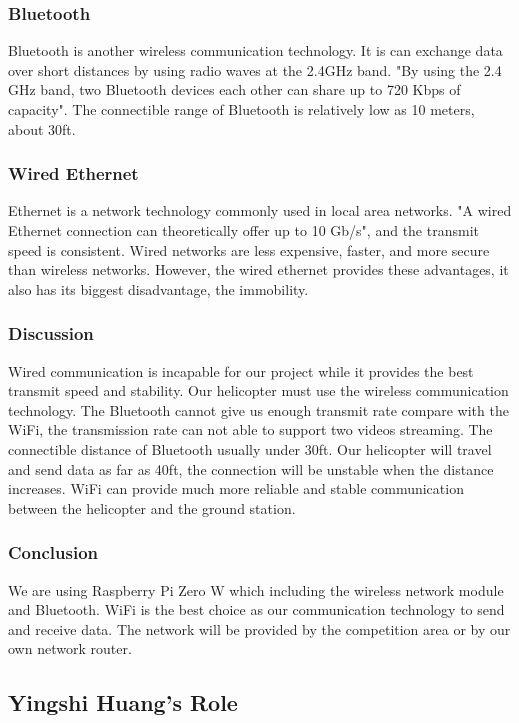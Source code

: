 \documentclass[onecolumn, draftclsnofoot,10pt, compsoc]{IEEEtran}
\begin{document}
\subsubsection{Bluetooth}
Bluetooth is another wireless communication technology. It is can exchange data over short distances by using radio waves at the 2.4GHz band. "By using the 2.4 GHz band, two Bluetooth devices each other can share up to 720 Kbps of capacity"\cite{r22}. The connectible range of Bluetooth is relatively low as 10 meters, about 30ft.

\subsubsection{Wired Ethernet}
Ethernet is a network technology commonly used in local area networks. "A wired Ethernet connection can theoretically offer up to 10 Gb/s"\cite{r21}, and the transmit speed is consistent. Wired networks are less expensive, faster, and more secure than wireless networks. However, the wired ethernet provides these advantages, it also has its biggest disadvantage, the immobility.

\subsubsection{Discussion}
Wired communication is incapable for our project while it provides the best transmit speed and stability. Our helicopter must use the wireless communication technology. The Bluetooth cannot give us enough transmit rate compare with the WiFi, the transmission rate can not able to support two videos streaming. The connectible distance of Bluetooth usually under 30ft. Our helicopter will travel and send data as far as 40ft, the connection will be unstable when the distance increases. WiFi can provide much more reliable and stable communication between the helicopter and the ground station. 

\subsubsection{Conclusion}
We are using Raspberry Pi Zero W which including the wireless network module and Bluetooth. WiFi is the best choice as our communication technology to send and receive data. The network will be provided by the competition area or by our own network router.



\subsection{Yingshi Huang's Role}
\end{document}
